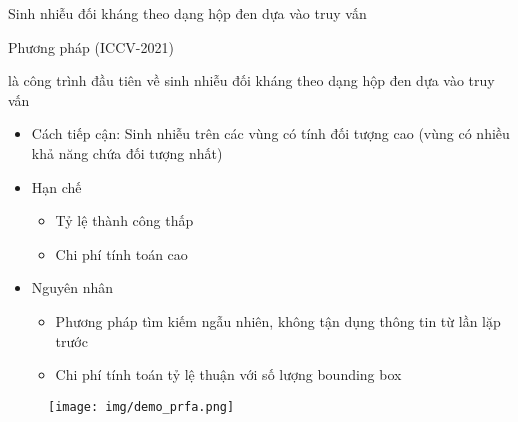 \documentclass[aspectratio=169, 12pt]{beamer}
\begin{document}
\begin{spacing}{1.1}
\begin{frame}{Sinh nhiễu đối kháng theo dạng hộp đen dựa vào truy vấn}
\begin{minipage}{0.27\textwidth}
    \end{minipage}
\end{frame}



\begin{frame}{Phương pháp \prfa (ICCV-2021)}

\begin{minipage}{0.7\textwidth}
\prfa là công trình đầu tiên về sinh nhiễu đối kháng theo dạng hộp đen dựa vào truy vấn

\begin{itemize}

    \item Cách tiếp cận: Sinh nhiễu trên các vùng có tính đối tượng cao (vùng có nhiều khả năng chứa đối tượng nhất)

    \item Hạn chế
    \begin{itemize}
        \item Tỷ lệ thành công thấp
        \item Chi phí tính toán cao
    \end{itemize}

    \item Nguyên nhân
    \begin{itemize}
        \item Phương pháp tìm kiếm ngẫu nhiên, không tận dụng thông tin từ lần lặp trước
        \item Chi phí tính toán tỷ lệ thuận với số lượng bounding box
    \end{itemize}

\end{itemize}
\end{minipage}
\hfill
\begin{minipage}{0.27\textwidth}
\centering
\begin{figure}[h]
\texttt{[image: img/demo\_prfa.png]}
\end{figure}
\end{minipage}

\end{frame}

\end{spacing}
\end{document}

